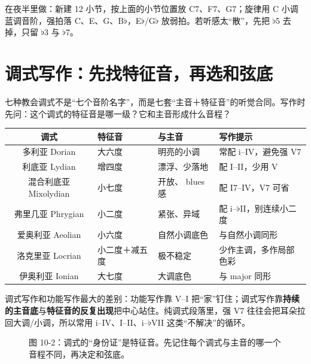 在夜半里做：新建 12 小节，按上面的小节位置放 C7、F7、G7；旋律用 C 小调蓝调音阶，强拍落 C、E、G、B\(\flat\)，E\(\flat\)/G\(\flat\) 放弱拍。若听感太“散”，先把 \(\flat\)5 去掉，只留 \(\flat\)3 与 \(\flat\)7。

\section{调式写作：先找特征音，再选和弦底}

七种教会调式不是“七个音阶名字”，而是七套“主音＋特征音”的听觉合同。写作时先问：这个调式的特征音是哪一级？它和主音形成什么音程？

\begin{center}
\small
\begin{tabular}{clll}
\toprule
调式 & 特征音 & 与主音 & 写作提示 \\
\midrule
多利亚 Dorian & 大六度 & 明亮的小调 & 常配 i--IV，避免强 V7 \\
利底亚 Lydian & 增四度 & 漂浮、少落地 & 配 I--II，少用 V \\
混合利底亚 Mixolydian & 小七度 & 开放、 blues 感 & 配 I7--IV，V7 可省 \\
弗里几亚 Phrygian & 小二度 & 紧张、异域 & 配 i--\(\flat\)II，别连续小二度 \\
爱奥利亚 Aeolian & 小六度 & 自然小调底色 & 与自然小调同形 \\
洛克里亚 Locrian & 小二度＋减五度 & 极不稳定 & 少作主调，多作局部色彩 \\
伊奥利亚 Ionian & 大七度 & 大调底色 & 与 major 同形 \\
\bottomrule
\end{tabular}
\end{center}

调式写作和功能写作最大的差别：功能写作靠 V--I 把“家”钉住；调式写作靠\textbf{持续的主音底}与\textbf{特征音的反复出现}把中心站住。纯调式段落里，强 V7 往往会把耳朵拉回大调/小调，所以常用 i--IV、I--II、i--\(\flat\)VII 这类“不解决”的循环。

\begin{figure}[htbp]
\centering
{}
\caption*{图 10-2：调式的“身份证”是特征音。先记住每个调式与主音的哪一个音程不同，再决定和弦底。}
\end{figure}


